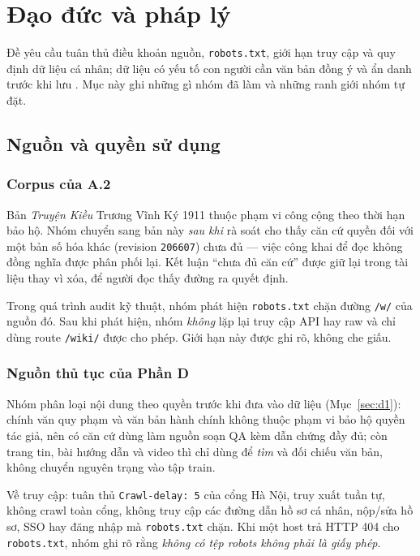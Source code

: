 \section{Đạo đức và pháp lý}
\label{sec:dao-duc}

Đề yêu cầu tuân thủ điều khoản nguồn, \texttt{robots.txt}, giới hạn truy cập và quy
định dữ liệu cá nhân; dữ liệu có yếu tố con người cần văn bản đồng ý và ẩn danh
trước khi lưu \cite[tr.~2, mục II]{de}. Mục này ghi những gì nhóm đã làm và những
ranh giới nhóm tự đặt.

\subsection{Nguồn và quyền sử dụng}

\subsubsection{Corpus của A.2}

Bản \emph{Truyện Kiều} Trương Vĩnh Ký 1911 thuộc phạm vi công cộng theo thời hạn
bảo hộ. Nhóm chuyển sang bản này \emph{sau khi} rà soát cho thấy căn cứ quyền đối
với một bản số hóa khác (revision \texttt{206607}) chưa đủ --- việc công khai để
đọc không đồng nghĩa được phân phối lại. Kết luận ``chưa đủ căn cứ'' được giữ lại
trong tài liệu thay vì xóa, để người đọc thấy đường ra quyết định.

Trong quá trình audit kỹ thuật, nhóm phát hiện \texttt{robots.txt} chặn đường
\texttt{/w/} của nguồn đó. Sau khi phát hiện, nhóm \emph{không} lặp lại truy cập
API hay raw và chỉ dùng route \texttt{/wiki/} được cho phép. Giới hạn này được ghi
rõ, không che giấu.

\subsubsection{Nguồn thủ tục của Phần D}

Nhóm phân loại nội dung theo quyền trước khi đưa vào dữ liệu
(Mục~\ref{sec:d1}): chính văn quy phạm và văn bản hành chính không thuộc phạm vi
bảo hộ quyền tác giả, nên có căn cứ dùng làm nguồn soạn QA kèm dẫn chứng đầy đủ;
còn trang tin, bài hướng dẫn và video thì chỉ dùng để \emph{tìm} và đối chiếu văn
bản, không chuyển nguyên trạng vào tập train.

Về truy cập: tuân thủ \texttt{Crawl-delay: 5} của cổng Hà Nội, truy xuất tuần tự,
không crawl toàn cổng, không truy cập các đường dẫn hồ sơ cá nhân, nộp/sửa hồ sơ,
SSO hay đăng nhập mà \texttt{robots.txt} chặn. Khi một host trả HTTP 404 cho
\texttt{robots.txt}, nhóm ghi rõ rằng \emph{không có tệp robots không phải là giấy
phép}.


